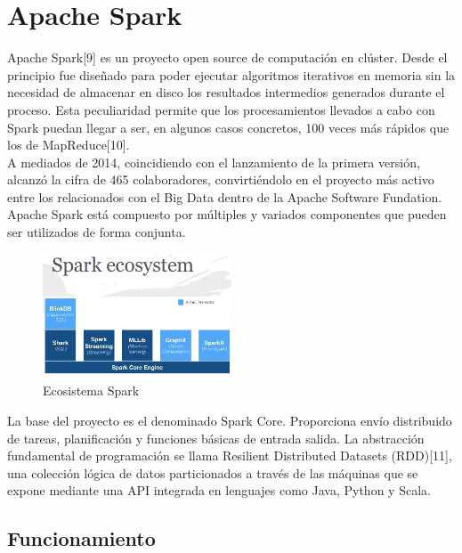 \section{Apache Spark}

Apache Spark[9] es un proyecto open source de computación en clúster. Desde el principio fue diseñado para poder ejecutar algoritmos iterativos en memoria sin la necesidad de almacenar en disco los resultados intermedios generados durante el proceso. Esta peculiaridad permite que los procesamientos llevados a cabo con Spark puedan llegar a ser, en algunos casos concretos, 100 veces más rápidos que los de MapReduce[10].\\

A mediados de 2014, coincidiendo con el lanzamiento de la primera versión, alcanzó la cifra de 465 colaboradores, convirtiéndolo en el proyecto más activo entre los relacionados con el Big Data dentro de la Apache Software Fundation.\\

Apache Spark está compuesto por múltiples y variados componentes que pueden ser utilizados de forma conjunta.\\

\begin{figure}[h]
	\centering
	\includegraphics[width=0.5\textwidth]{Ilustraciones/spark_ecosystem.png}
	\caption{Ecosistema Spark}
	\label{fig:ipanel}
\end{figure}

La base del proyecto es el denominado Spark Core. Proporciona envío distribuido de tareas, planificación y funciones básicas de entrada salida. La abstracción fundamental de programación se llama Resilient Distributed Datasets (RDD)[11], una colección lógica de datos particionados a través de las máquinas que se expone mediante una API integrada en lenguajes como Java, Python y Scala.\\

\subsection{Funcionamiento}

